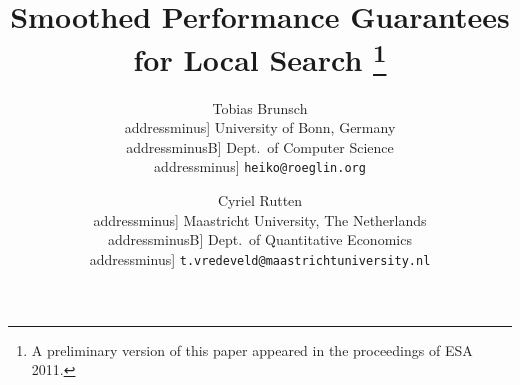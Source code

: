 \documentclass[a4paper,11pt,fleqn]{article}
\title{Smoothed Performance Guarantees for Local Search \footnote{A preliminary version of this paper appeared in the proceedings of ESA 2011.} }
\author{Tobias Brunsch\\addressminus]
      	\footnotesize University of Bonn, Germany\\addressminusB]
        \footnotesize Dept.~of Computer Science\\addressminus]
        \footnotesize {\tt heiko@roeglin.org}
 \and Cyriel Rutten\\addressminus]
  	\footnotesize Maastricht University, The Netherlands\\addressminusB]
	\footnotesize Dept.~of Quantitative Economics\\addressminus]
  	\footnotesize {\tt t.vredeveld@maastrichtuniversity.nl}
}
\date{}
\begin{document}
\maketitle

\allowdisplaybreaks

\newtheorem{theorem}{Theorem}
\newtheorem{lemma}[theorem]{Lemma}
\newtheorem{cor}[theorem]{Corollary}
\newtheorem{prop}[theorem]{Proposition}
\newtheorem{claim}{Claim}

\newtheorem{definition}[theorem]{Definition}

\newtheorem*{remark}{Remark}
\newtheorem{property}{Property}

\newenvironment{artclfig}{\begin{figure}[htbp]\begin{center}}{\end{center}\end{figure}}

\newcommand{\sched}{\ensuremath{\sigma}\xspace}
\newcommand{\cmax}{\ensuremath{C_{\max}}\xspace}
\newcommand{\copt}{\ensuremath{\cmax^*}\xspace}
\newcommand{\csched}[1][\sched]{\ensuremath{\cmax(#1)}\xspace}
\newcommand{\load}[2][]{\ensuremath{L#1_{#2}}\xspace}


\newcommand{\Prob}{\ensuremath{\mathop{\mathbf{Pr}}}\xspace}
\newcommand{\Probe}[1]{\ensuremath{\Prob[#1]\,}\xspace}
\newcommand{\Probl}[2][]{\ensuremath{\Prob\limits_{#1}\left[#2\right]}\xspace}

\newcommand{\E}{\ensuremath{\mathop{\mathbf{E}}}\xspace}
\newcommand{\Ee}[1]{\ensuremath{\E[#1]}\xspace}
\newcommand{\El}[2][]{\ensuremath{\E\limits_{#1}\left[#2\right]}\xspace}

\newcommand{\opt}{\ensuremath{\sched^*}\xspace}
\newcommand{\critmach}{\ensuremath{i_{\max}}\xspace}
\newcommand{\loadsched}[1]{\ensuremath{L_{#1}}(\sched)\xspace}
\newcommand{\jobset}[1][]{\ensuremath{J_{#1}}\xspace}
\newcommand{\jobsetsched}[1]{\ensuremath{J_{#1}}(\sched)\xspace}
\newcommand{\pmax}{\ensuremath{p_{\max}}\xspace}
\newcommand{\event}{\ensuremath{\mathcal{E}}\xspace}
\newcommand{\e}{\ensuremath{e}\xspace}
\newcommand{\allow}[1]{\ensuremath{{\cal M}_{#1}}\xspace}
\newcommand{\psmooth}{\ensuremath{\mathbf{p}}\xspace}

\newcommand{\jobs}[2][\sched]{\ensuremath{J_{#2}({#1})}\xspace}
\newcommand{\schedopt}{\sched^*}

\newcommand{\jobclass}[1]{\ensuremath{\mathcal{J}_{#1}}}

\newcommand{\smin}{s_{\min}}
\newcommand{\smax}{s_{\max}}
\end{document}
